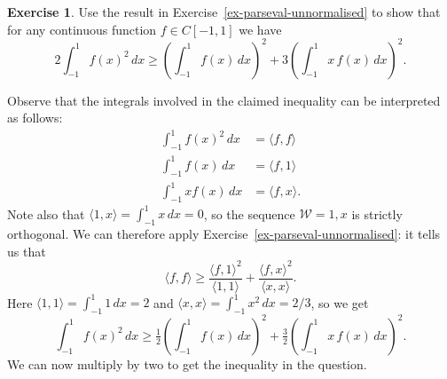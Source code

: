 \documentclass{amsart}
\newcommand{\ip}[1]     {\langle #1\rangle}
\newcommand{\CW}        {{\mathcal{W}}}
\renewcommand{\:}       {\colon}
\theoremstyle{definition}
\newtheorem{exercise}{Exercise}[section]
\renewenvironment{solution}{\SolutionAtEnd}{\endSolutionAtEnd}
\begin{document}
\begin{exercise}
 Use the result in Exercise~\ref{ex-parseval-unnormalised} to show
 that for any continuous function $f\in C[-1,1]$ we have
 \[ \textstyle 
    2 \int_{-1}^1 f(x)^2\,dx \geq 
    \left(\int_{-1}^1 f(x)\,dx\right)^2 +
    3 \left(\int_{-1}^1 x\,f(x)\,dx\right)^2.
 \]
\end{exercise}
\begin{solution}
 Observe that the integrals involved in the claimed inequality can be
 interpreted as follows:
 \begin{align*}
  \int_{-1}^1 f(x)^2\,dx &= \ip{f,f} \\
  \int_{-1}^1 f(x)\,dx   &= \ip{f,1} \\
  \int_{-1}^1 x f(x)\,dx &= \ip{f,x}.
 \end{align*}
 Note also that $\ip{1,x}=\int_{-1}^1x\,dx=0$, so the sequence
 $\CW=1,x$ is strictly orthogonal.  We can therefore apply
 Exercise~\ref{ex-parseval-unnormalised}: it tells us that
 \[ \ip{f,f} \geq \frac{\ip{f,1}^2}{\ip{1,1}} + 
                  \frac{\ip{f,x}^2}{\ip{x,x}}.
 \]
 Here $\ip{1,1}=\int_{-1}^1 1\,dx=2$ and
 $\ip{x,x}=\int_{-1}^1x^2\,dx=2/3$, so we get
 \[ \int_{-1}^1 f(x)^2\, dx 
     \geq \tfrac{1}{2} \left(\int_{-1}^1 f(x)\,dx\right)^2 + 
          \tfrac{3}{2} \left(\int_{-1}^1 x\,f(x)\,dx\right)^2. 
 \]
 We can now multiply by two to get the inequality in the question.
\end{solution}
\end{document}
